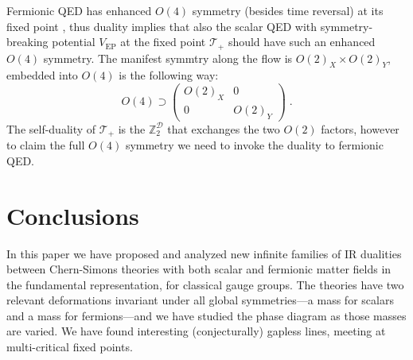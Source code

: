 \documentclass[a4paper, 12pt]{article}
\numberwithin{equation}{section}
\newcommand{\mat}[1]{\begin{pmatrix} #1 \end{pmatrix}}
\newcommand{\be}{\begin{equation}} \newcommand{\ee}{\end{equation}}
\newcommand{\cD}{\mathcal{D}}
\newcommand{\cT}{\mathcal{T}}
\newcommand{\bZ}{\mathbb{Z}}
\begin{document}
Fermionic QED has enhanced $O(4)$ symmetry (besides time reversal) at its fixed point \cite{Xu:2015lxa, Hsin:2016blu}, thus duality implies that also the scalar QED with symmetry-breaking potential $V_\text{EP}$ at the fixed point $\cT_+$ should have such an enhanced $O(4)$ symmetry. The manifest symmtry along the flow is $O(2)_X \times O(2)_Y$, embedded into $O(4)$ is the following way:
\be
O(4) \supset \mat{ O(2)_X & 0 \\ 0 & O(2)_Y} \;.
\ee
The self-duality of $\cT_+$ is the $\bZ_2^\cD$ that exchanges the two $O(2)$ factors, however to claim the full $O(4)$ symmetry we need to invoke the duality to fermionic QED.
























































\section{Conclusions}
\label{sec: conclusions}

In this paper we have proposed and analyzed new infinite families of IR dualities between Chern-Simons theories with both scalar and fermionic matter fields in the fundamental representation, for classical gauge groups. The theories have two relevant deformations invariant under all global symmetries---a mass for scalars and a mass for fermions---and we have studied the phase diagram as those masses are varied. We have found interesting (conjecturally) gapless lines, meeting at multi-critical fixed points.
\end{document}
